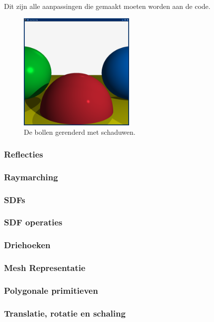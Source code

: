 \documentclass[12pt, a4paper]{article}
\begin{document}
Dit zijn alle aanpassingen die gemaakt moeten worden aan de code.

\begin{figure}[h]
    \centering
    \includegraphics[width=0.50\textwidth]{renders/schaduw.png}
    \caption{De bollen gerenderd met schaduwen.}
    \label{fig:schaduw}
\end{figure}

\subsubsection{Reflecties}
\subsubsection{Raymarching}
\subsubsection{SDFs}
\subsubsection{SDF operaties}
\subsubsection{Driehoeken}
\subsubsection{Mesh Representatie}
\subsubsection{Polygonale primitieven}
\subsubsection{Translatie, rotatie en schaling}
\end{document}
